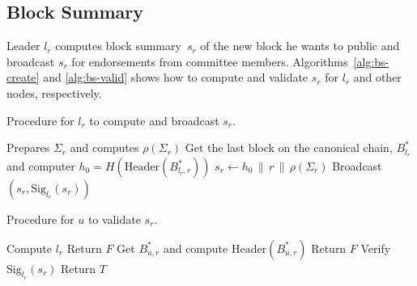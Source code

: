 \documentclass{article}
\begin{document}

\subsection{Block Summary}
Leader $l_r$ computes block summary~$s_r$ of the new block he wants to public and broadcast $s_r$ for endorsements from committee members. Algorithms~\ref{alg:bs-create} and \ref{alg:bs-valid} shows how to compute and validate $s_r$ for $l_r$ and other nodes, respectively.

\begin{algorithm}[H]
\caption{Procedure for $l_r$ to compute and broadcast $s_r$.}
\label{alg:bs-create}
\begin{spacing}{1.2}
\begin{algorithmic}[1]
    \vspace{1ex}
    \State Prepares $\Sigma_r$ and computes $\rho\left(\Sigma_r\right)$
    \State Get the last block on the canonical chain, $B_{l_r}^*$ and computer $h_0=H(\textrm{Header}(B_{l_r,r}^*))$
    \State $s_r\leftarrow h_0\,\|\,r\,\|\,\rho\left(\Sigma_r\right)$
    \State Broadcast $\left(s_r,\textrm{Sig}_{l_r}(s_r)\right)$
\end{algorithmic}
\end{spacing}
\end{algorithm}

\begin{algorithm}[H]
\caption{Procedure for $u$ to validate $s_r$.}
\label{alg:bs-valid}
\begin{spacing}{1.2}
\begin{algorithmic}[1]
    \vspace{1ex}
    \State Compute $l_r$
        \State Return $F$
    \EndIf
    \State Get $B_{u,r}^*$ and compute $\textrm{Header}(B_{u,r}^*)$
        \State Return $F$
    \EndIf
    \State Verify $\textrm{Sig}_{l_r}(s_r)$
    \State Return $T$
\end{algorithmic}
\end{spacing}
\end{algorithm}
\end{document}
